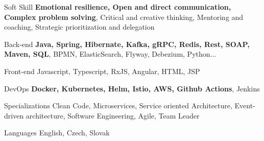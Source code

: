 

\begin{cvskills}

  \vspace{0.6em}
  \cvskill
  {Soft Skill} %
  {\textbf{Emotional resilience, Open and direct communication, Complex problem solving}, Critical and creative thinking,\newline
  Mentoring and coaching, Strategic prioritization and delegation} %

  \cvskill
  {Back-end} %
  {\textbf{Java, Spring, Hibernate, Kafka, gRPC, Redis, Rest, SOAP, Maven, SQL}, BPMN, ElasticSearch, Flyway, Debezium, Python...} %

  \cvskill
  {Front-end} %
  {Javascript, Typescript, RxJS, Angular, HTML, JSP} %

  \cvskill
  {DevOps} %
  {\textbf{Docker, Kubernetes, Helm, Istio, AWS, Github Actions}, Jenkins} %

  \cvskill
  {Specializations} %
  {Clean Code, Microservices, Service oriented Architecture, Event-driven architecture, Software Engineering, Agile,
    Team Leader} %

  \cvskill
  {Languages} %
  {English, Czech, Slovak} %

\end{cvskills}
